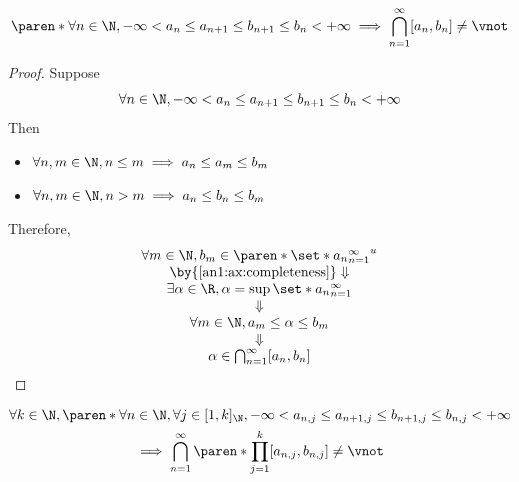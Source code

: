 \begin{lemma} \label{an1:lem:nested-intervals}
  \[
    \paren*{\forall n \in \N, - \infty < a_{n} \leq a_{n + 1} \leq b_{n + 1} \leq b_{n} < + \infty}
    \implies \bigcap_{n = 1}^{\infty} [a_{n}, b_{n}] \neq \vnot
  \]
\end{lemma}

\begin{proof}
  Suppose
  \[
    \forall n \in \N, - \infty < a_{n} \leq a_{n + 1} \leq b_{n + 1} \leq b_{n} < + \infty
  \]
  Then
  \begin{itemize}
    \item $\forall n, m \in \N, n \leq m \implies a_{n} \leq a_{m} \leq b_{m}$
    \item $\forall n, m \in \N, n > m \implies a_{n} \leq b_{n} \leq b_{m}$
  \end{itemize}
  Therefore,
  \[
    \begin{array}{c}
      \forall m \in \N, b_{m} \in \paren*{\set*{a_{n}}_{n = 1}^{\infty}}^{u} \\
      \by{\Cref{an1:ax:completeness}} \Downarrow                             \\
      \exists \alpha \in \R, \alpha = \sup \set*{a_{n}}_{n = 1}^{\infty}     \\
      \Downarrow                                                             \\
      \forall m \in \N, a_{m} \leq \alpha \leq b_{m}                         \\
      \Downarrow                                                             \\
      \alpha \in \bigcap_{n = 1}^{\infty} [a_{n}, b_{n}]
    \end{array}
  \]
\end{proof}

\begin{theorem} \label{an1:thm:nested-k-cells}
  \[
    \begin{gathered}
      \forall k \in \N, \paren*{
        \forall n \in \N, \forall j \in [1, k]_{\N}, - \infty < a_{n, j}
        \leq a_{n + 1, j} \leq b_{n + 1, j} \leq b_{n, j} < + \infty
      } \\
      \implies \bigcap_{n = 1}^{\infty} \paren*{\prod_{j = 1}^{k} [a_{n, j}, b_{n, j}]} \neq \vnot
    \end{gathered}
  \]
\end{theorem}

